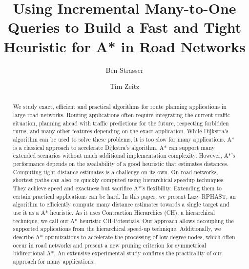 \documentclass[manuscript,review]{acmart}
\begin{document}

\title{Using Incremental Many-to-One Queries to Build a Fast and Tight Heuristic for A* in Road Networks}

\author{Ben Strasser}
\affiliation{}

\author{Tim Zeitz}


\renewcommand{\shortauthors}{B. Strasser and T. Zeitz}


\begin{abstract}
We study exact, efficient and practical algorithms for route planning applications in large road networks.
Routing applications often require integrating the current traffic situation, planning ahead with traffic predictions for the future, respecting forbidden turns, and many other features depending on the exact application.
While Dijkstra's algorithm can be used to solve these problems, it is too slow for many applications.
A* is a classical approach to accelerate Dijkstra's algorithm.
A* can support many extended scenarios without much additional implementation complexity.
However, A*'s performance depends on the availability of a good heuristic that estimates distances.
Computing tight distance estimates is a challenge on its own.
On road networks, shortest paths can also be quickly computed using hierarchical speedup techniques.
They achieve speed and exactness but sacrifice A*'s flexibility.
Extending them to certain practical applications can be hard.
In this paper, we present Lazy RPHAST, an algorithm to efficiently compute many distance estimates towards a single target and use it as a A* heuristic.
As it uses Contraction Hierarchies (CH), a hierarchical technique, we call our A* heuristic CH-Potentials.
Our approach allows decoupling the supported applications from the hierarchical speed-up technique.
Additionally, we describe A* optimizations to accelerate the processing of low degree nodes, which often occur in road networks and present a new pruning criterion for symmetrical bidirectional A*.
An extensive experimental study confirms the practicality of our approach for many applications.
\end{abstract}
\end{document}
